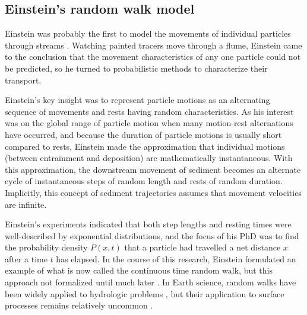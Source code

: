 \subsection{Einstein's random walk model}
\label{sec:einwalk}
Einstein was probably the first to model the movements of individual particles through streams \citep{Einstein1937}.
Watching painted tracers move through a flume, Einstein came to the conclusion that the movement characteristics of any one particle could not be predicted, so he turned to probabilistic methods to characterize their transport.

Einstein's key insight was to represent particle motions as an alternating sequence of movements and rests having random characteristics.
As his interest was on the global range of particle motion when many motion-rest alternations have occurred, and because the duration of particle motions is usually short compared to rests, Einstein made the approximation that individual motions (between entrainment and deposition) are mathematically instantaneous.
With this approximation, the downstream movement of sediment becomes an alternate cycle of instantaneous steps of random length and rests of random duration. 
Implicitly, this concept of sediment trajectories assumes that movement velocities are infinite.

Einstein's experiments indicated that both step lengths and resting times were well-described by exponential distributions, and the focus of his PhD was to find the probability density $P(x,t)$ that a particle had travelled a net distance $x$ after a time $t$ has elapsed. In the course of this research, Einstein formulated an example of what is now called the continuous time random walk, but this approach not formalized until much later \citep{Montroll1965}. In Earth science, random walks have been widely applied to hydrologic problems \citep{Berkowitz2006}, but their application to surface processes remains relatively uncommon \citep[e.g.][]{Schumer2009}.


